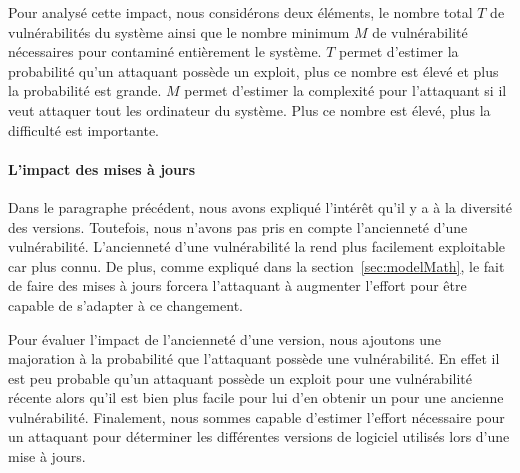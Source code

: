Pour analysé cette impact, nous considérons deux éléments, le nombre total $T$ de vulnérabilités du système ainsi que le nombre minimum $M$ de vulnérabilité nécessaires pour contaminé entièrement le système.
$T$ permet d'estimer la probabilité qu'un attaquant possède un exploit, plus ce nombre est élevé et plus la probabilité est grande.
$M$ permet d'estimer la complexité pour l'attaquant si il veut attaquer tout les ordinateur du système.
Plus ce nombre est élevé, plus la difficulté est importante.

\paragraph{L'impact des mises à jours}
Dans le paragraphe précédent, nous avons expliqué l'intérêt qu'il y a à la diversité des versions.
Toutefois, nous n'avons pas pris en compte l'ancienneté d'une vulnérabilité. 
L'ancienneté d'une vulnérabilité la rend plus facilement exploitable car plus connu.
De plus, comme expliqué dans la section~\ref{sec:modelMath}, le fait de faire des mises à jours forcera l'attaquant à augmenter l'effort pour être capable de s'adapter à ce changement.

Pour évaluer l'impact de l'ancienneté d'une version, nous ajoutons une majoration à la probabilité que l'attaquant possède une vulnérabilité.
En effet il est peu probable qu'un attaquant possède un exploit pour une vulnérabilité récente alors qu'il est bien plus facile pour lui d'en obtenir un pour une ancienne vulnérabilité.
Finalement, nous sommes capable d'estimer l'effort nécessaire pour un attaquant pour déterminer les différentes versions de logiciel utilisés lors d'une mise à jours.

